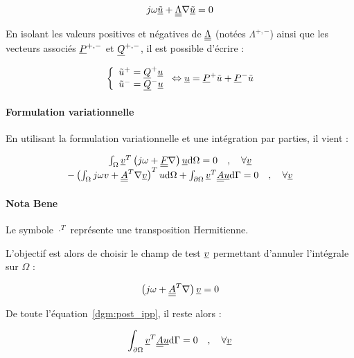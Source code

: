\begin{equation*}
    j\omega \underline{\tilde{u}} + \underline{\underline{\Lambda}}\nabla\underline{\tilde{u}} = 0
\end{equation*}

En isolant les valeurs positives et négatives de $\underline{\underline{\Lambda}}$  (notées $\Lambda^{+,-}$) ainsi que les vecteurs
associés $\underline{P}^{+,-}$ et $\underline{Q}^{+,-}$, il est possible d'écrire :

\begin{equation}
    \left\{\begin{array}{l}
        \tilde{u}^+ = \underline{Q}^+\underline{u}\\
        \tilde{u}^- = \underline{Q}^-\underline{u}
    \end{array}\right. \Leftrightarrow
    \underline{u} = \underline{P}^+\tilde{u} + \underline{P}^-\tilde{u} \label{dgm:sep_u}
\end{equation}


\paragraph{Formulation variationnelle}

En utilisant la formulation variationnelle et une intégration par parties, il vient :

\begin{equation}
    \begin{array}{c}
    \int_\Omega \underline{v}^T\left(j\omega + \underline{\underline{F}}\nabla\right)\underline{u}\mathrm{d}\Omega = 0 \quad,\quad \forall\underline{v}\\
    -\left(\int_\Omega j\omega v + \underline{\underline{A}}^T\nabla\underline{v}\right)^Tu\mathrm{d}\Omega +
        \int_{\partial\Omega}\underline{v}^T\underline{\underline{A}}\underline{u}\mathrm{d}\Gamma = 0 \quad,\quad \forall\underline{v}
    \end{array}
    \label{dgm:post_ipp}
\end{equation}

\paragraph{Nota Bene} Le symbole $\cdot^T$ représente une transposition Hermitienne.

L'objectif est alors de choisir le champ de test $\underline{v}$ permettant d'annuler l'intégrale sur $\Omega$ :

\begin{equation}
    \left(j\omega + \underline{\underline{A}}^T\nabla\right)\underline{v} = 0 \label{dgm:eq_v}
\end{equation}

De toute l'équation~\eqref{dgm:post_ipp}, il reste alors :

\begin{equation}
    \int_{\partial\Omega}\underline{v}^T\underline{\underline{A}}\underline{u}\mathrm{d}\Gamma = 0 \quad,\quad \forall\underline{v}\label{dgm:to_solve}
\end{equation}

